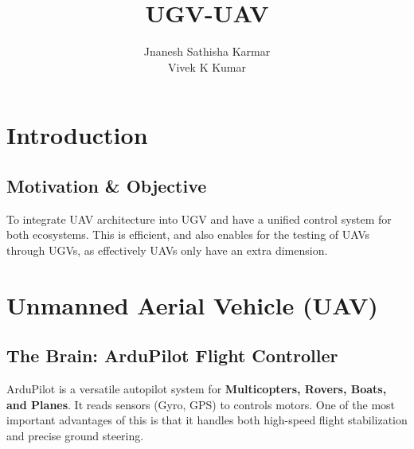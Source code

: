 \documentclass{scrreprt}
\title{UGV-UAV}
\author{Jnanesh Sathisha Karmar\\Vivek K Kumar}
\begin{document}
\maketitle

\renewcommand{\thefigure}{\theenumi}
\renewcommand{\thetable}{\theenumi}


\tableofcontents

\chapter{Introduction}
\section{Motivation \& Objective}
To integrate UAV architecture into UGV and have a unified control system for both ecosystems. This is efficient, and also enables for the testing of UAVs through UGVs, as effectively UAVs only have an extra dimension.

\chapter{Unmanned Aerial Vehicle (UAV)}
\section{The Brain: ArduPilot Flight Controller}
ArduPilot is a versatile autopilot system for \textbf{Multicopters, Rovers, Boats, and Planes}. It reads sensors (Gyro, GPS)  to controls motors. One of the most important advantages of this is that it handles both high-speed flight stabilization and precise ground steering. 
\end{document}
